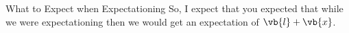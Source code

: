 \begin{answer}
\begin{answerpart}{What to Expect when Expectationing}
    So, I expect that you expected that while we were expectationing
    then we would get an expectation of $\vb{l} + \vb{x}$.

  \end{answerpart}


\end{answer}
